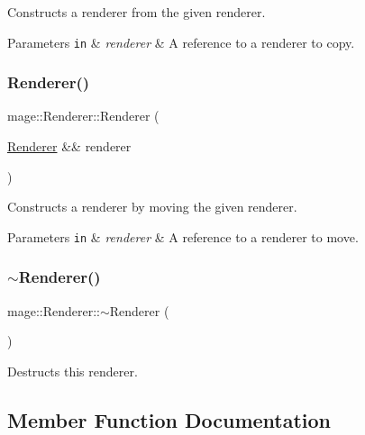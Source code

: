 Constructs a renderer from the given renderer.


\begin{DoxyParams}[1]{Parameters}
\mbox{\tt in}  & {\em renderer} & A reference to a renderer to copy. \\
\hline
\end{DoxyParams}
\hypertarget{classmage_1_1_renderer_a24a9346ca7aed427b49d0e4ed4984da3}{}\label{classmage_1_1_renderer_a24a9346ca7aed427b49d0e4ed4984da3} 
\subsubsection{\texorpdfstring{Renderer()}{Renderer()}\hspace{0.1cm}{\footnotesize\ttfamily [3/3]}}
{\footnotesize\ttfamily mage\+::\+Renderer\+::\+Renderer (\begin{DoxyParamCaption}\item[{\hyperlink{classmage_1_1_renderer}{Renderer} \&\&}]{renderer }\end{DoxyParamCaption})\hspace{0.3cm}{\ttfamily [default]}}

Constructs a renderer by moving the given renderer.


\begin{DoxyParams}[1]{Parameters}
\mbox{\tt in}  & {\em renderer} & A reference to a renderer to move. \\
\hline
\end{DoxyParams}
\hypertarget{classmage_1_1_renderer_a997e041f28cc71d069d1ab7d29fe6ced}{}\label{classmage_1_1_renderer_a997e041f28cc71d069d1ab7d29fe6ced} 
\subsubsection{\texorpdfstring{$\sim$\+Renderer()}{~Renderer()}}
{\footnotesize\ttfamily mage\+::\+Renderer\+::$\sim$\+Renderer (\begin{DoxyParamCaption}{ }\end{DoxyParamCaption})}

Destructs this renderer. 

\subsection{Member Function Documentation}
\hypertarget{classmage_1_1_renderer_a3eadaa4b37cd9ad9a3da9f72879b0722}{}\label{classmage_1_1_renderer_a3eadaa4b37cd9ad9a3da9f72879b0722} 
